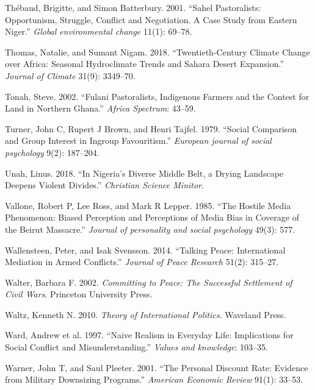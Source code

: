 \documentclass[11pt]{article}
\begin{document}
\leavevmode\hypertarget{ref-thebaud2001sahel}{}%
Thébaud, Brigitte, and Simon Batterbury. 2001. ``Sahel Pastoralists:
Opportunism, Struggle, Conflict and Negotiation. A Case Study from
Eastern Niger.'' \emph{Global environmental change} 11(1): 69--78.

\leavevmode\hypertarget{ref-thomas2018sahara}{}%
Thomas, Natalie, and Sumant Nigam. 2018. ``Twentieth-Century Climate
Change over Africa: Seasonal Hydroclimate Trends and Sahara Desert
Expansion.'' \emph{Journal of Climate} 31(9): 3349--70.

\leavevmode\hypertarget{ref-tonah2002fulani}{}%
Tonah, Steve. 2002. ``Fulani Pastoralists, Indigenous Farmers and the
Contest for Land in Northern Ghana.'' \emph{Africa Spectrum}: 43--59.

\leavevmode\hypertarget{ref-turner1979social}{}%
Turner, John C, Rupert J Brown, and Henri Tajfel. 1979. ``Social
Comparison and Group Interest in Ingroup Favouritism.'' \emph{European
journal of social psychology} 9(2): 187--204.

\leavevmode\hypertarget{ref-unah2018nigeria}{}%
Unah, Linus. 2018. ``In Nigeria's Diverse Middle Belt, a Drying
Landscape Deepens Violent Divides.'' \emph{Christian Science Minitor}.

\leavevmode\hypertarget{ref-vallone1985hostileMedia}{}%
Vallone, Robert P, Lee Ross, and Mark R Lepper. 1985. ``The Hostile
Media Phenomenon: Biased Perception and Perceptions of Media Bias in
Coverage of the Beirut Massacre.'' \emph{Journal of personality and
social psychology} 49(3): 577.

\leavevmode\hypertarget{ref-wallensteen2014talking}{}%
Wallensteen, Peter, and Isak Svensson. 2014. ``Talking Peace:
International Mediation in Armed Conflicts.'' \emph{Journal of Peace
Research} 51(2): 315--27.

\leavevmode\hypertarget{ref-walter2002committing}{}%
Walter, Barbara F. 2002. \emph{Committing to Peace: The Successful
Settlement of Civil Wars}. Princeton University Press.

\leavevmode\hypertarget{ref-waltz2010theory}{}%
Waltz, Kenneth N. 2010. \emph{Theory of International Politics}.
Waveland Press.

\leavevmode\hypertarget{ref-ward1997naive}{}%
Ward, Andrew et al. 1997. ``Naive Realism in Everyday Life: Implications
for Social Conflict and Misunderstanding.'' \emph{Values and knowledge}:
103--35.

\leavevmode\hypertarget{ref-warner2001personal}{}%
Warner, John T, and Saul Pleeter. 2001. ``The Personal Discount Rate:
Evidence from Military Downsizing Programs.'' \emph{American Economic
Review} 91(1): 33--53.
\end{document}
